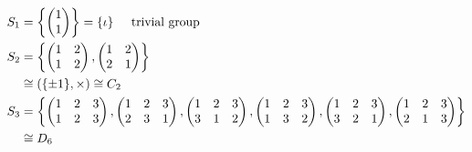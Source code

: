 \begin{example}
  
\begin{align*}
  S_1 &= \left\{ \begin{pmatrix}1 \\1\end{pmatrix} \right\} = \{ \iota \} \hspace{.5cm} \text{trivial group} \\
  S_2 &= \left\{ \begin{pmatrix}
  1 & 2 \\
  1 & 2
  \end{pmatrix}, \begin{pmatrix}
  1 & 2 \\
  2 & 1
  \end{pmatrix} \right\} \\
  &\cong \left( \{ \pm 1 \}, \times \right) \cong C_2 \\
  S_3 &= \left\{ \begin{pmatrix}
  1 & 2 & 3 \\
  1 & 2 & 3
  \end{pmatrix}, 
  \begin{pmatrix}
  1 & 2 & 3 \\
  2 & 3 & 1
  \end{pmatrix}, 
  \begin{pmatrix}
      1 & 2 & 3 \\
      3 & 1 & 2
  \end{pmatrix}, 
  \begin{pmatrix}
      1 & 2 & 3 \\
      1 & 3 & 2
  \end{pmatrix}, 
  \begin{pmatrix}
      1 & 2 & 3 \\
      3 & 2 & 1
  \end{pmatrix}, 
  \begin{pmatrix}
      1 & 2 & 3 \\
      2 & 1 & 3
  \end{pmatrix} \right\} \\
  & \cong D_6
\end{align*}
\end{example} 

